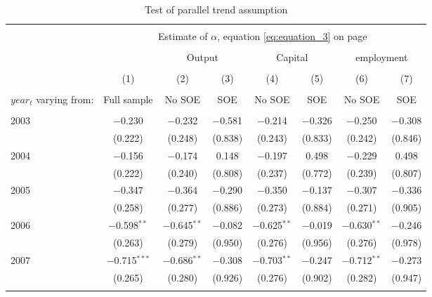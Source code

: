 \documentclass[12pt]{article}
\begin{document}
\begin{table}[!htb] \centering
  \caption{\\ Test of parallel trend assumption} 
\label{table_6}
\begin{adjustbox}{width=\textwidth, totalheight=\baselineskip,keepaspectratio}
\begin{tabular}{@{\extracolsep{5pt}}lccccccc} 
\\[-1.8ex]\hline 
\hline \\[-1.8ex] 
 & \multicolumn{7}{c}{Estimate of $\alpha$, equation \ref{eq:equation_3} on page \pageref{eq:equation_3}} \\ 
\cline{2-8}
            
\\[-1.8ex]
            &\multicolumn{1}{c}{}&\multicolumn{2}{c}{Output}&\multicolumn{2}{c}{Capital}&\multicolumn{2}{c}{employment}\\
\\[-1.8ex] & (1) & (2) & (3) & (4) & (5) & (6) & (7)\\
 \\[-1.8ex]$year_t$ varying from: & Full sample & No SOE & SOE & No SOE & SOE & No SOE & SOE\\
 \hline \\[-1.8ex] 
  2003 & $-$0.230 & $-$0.232 & $-$0.581 & $-$0.214 & $-$0.326 & $-$0.250 & $-$0.308 \\ 
  & (0.222) & (0.248) & (0.838) & (0.243) & (0.833) & (0.242) & (0.846) \\ 
  2004 & $-$0.156 & $-$0.174 & 0.148 & $-$0.197 & 0.498 & $-$0.229 & 0.498 \\ 
  & (0.222) & (0.240) & (0.808) & (0.237) & (0.772) & (0.239) & (0.807) \\ 
  2005 & $-$0.347 & $-$0.364 & $-$0.290 & $-$0.350 & $-$0.137 & $-$0.307 & $-$0.336 \\ 
  & (0.258) & (0.277) & (0.886) & (0.273) & (0.884) & (0.271) & (0.905) \\ 
  2006 & $-$0.598$^{**}$ & $-$0.645$^{**}$ & $-$0.082 & $-$0.625$^{**}$ & $-$0.019 & $-$0.630$^{**}$ & $-$0.246 \\ 
  & (0.263) & (0.279) & (0.950) & (0.276) & (0.956) & (0.276) & (0.978) \\ 
  2007 & $-$0.715$^{***}$ & $-$0.686$^{**}$ & $-$0.308 & $-$0.703$^{**}$ & $-$0.247 & $-$0.712$^{**}$ & $-$0.273 \\ 
  & (0.265) & (0.280) & (0.926) & (0.276) & (0.902) & (0.282) & (0.947) \\ 
 \hline \\[-1.8ex] 

\end{tabular}
\end{adjustbox}
\end{table}
\end{document}
